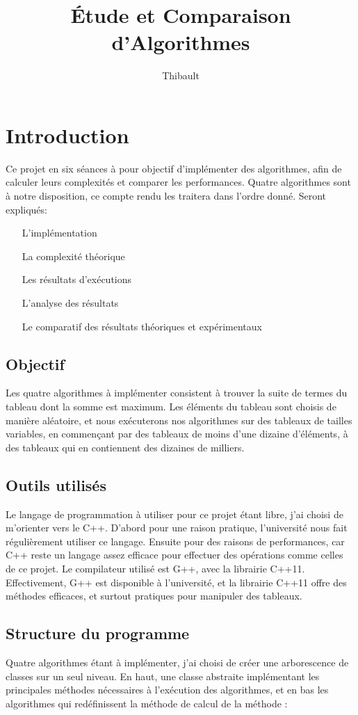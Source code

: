 \documentclass[a4paper, 12pt]{article}
\author{Thibault \bsc{BEZIERS LA FOSSE}}
\date{}
\title{Étude et Comparaison d'Algorithmes}
\begin{document}
\maketitle
\clearpage

\tableofcontents
\clearpage

\section{Introduction}
Ce projet en six séances à pour objectif d'implémenter des algorithmes, afin de calculer leurs complexités et comparer les performances. 
Quatre algorithmes sont à notre disposition, ce compte rendu les traitera dans l'ordre donné. Seront expliqués:
\begin{itemize}
\item[L'implémentation]
\item[La complexité théorique]
\item[Les résultats d'exécutions]
\item[L'analyse des résultats]
\item[Le comparatif des résultats théoriques et expérimentaux]
\end{itemize}
\subsection{Objectif}
Les quatre algorithmes à implémenter consistent à trouver la suite de termes du tableau dont la somme est maximum. 
Les éléments du tableau sont choisis de manière aléatoire, et nous exécuterons nos algorithmes sur des tableaux de tailles variables, en commençant par des tableaux de moins d'une dizaine d'éléments, à des tableaux qui en contiennent des dizaines de milliers.  
\subsection{Outils utilisés}
Le langage de programmation à utiliser pour ce projet étant libre, j'ai choisi de m'orienter vers le C++. D'abord pour une raison pratique, l'université nous fait régulièrement utiliser ce langage. Ensuite pour des raisons de performances, car C++ reste un langage assez efficace pour effectuer des opérations comme celles de ce projet.
Le compilateur utilisé est G++, avec la librairie C++11. Effectivement, G++ est disponible à l'université, et la librairie C++11 offre des méthodes efficaces, et surtout pratiques pour manipuler des tableaux. 
\subsection{Structure du programme}
Quatre algorithmes étant à implémenter, j'ai choisi de créer une arborescence de classes sur un seul niveau. En haut, une classe abstraite implémentant les principales méthodes nécessaires à l’exécution des algorithmes, et en bas les algorithmes qui redéfinissent la méthode de calcul de la méthode :
\end{document}
